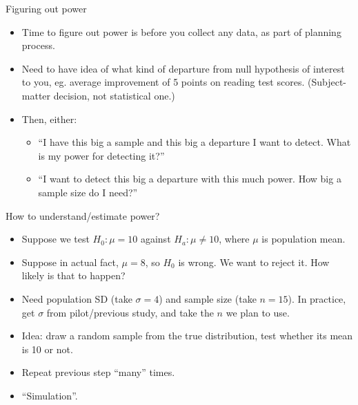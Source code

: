 \documentclass[
  ignorenonframetext,
]{beamer}
\providecommand{\tightlist}{%
  \setlength{\itemsep}{0pt}\setlength{\parskip}{0pt}}
\begin{document}
\begin{frame}{Figuring out power}
\protect\hypertarget{figuring-out-power}{}

\begin{itemize}
\tightlist
\item
  Time to figure out power is before you collect any data, as part of
  planning process.
\item
  Need to have idea of what kind of departure from null hypothesis of
  interest to you, eg. average improvement of 5 points on reading test
  scores. (Subject-matter decision, not statistical one.)
\item
  Then, either:

  \begin{itemize}
  \tightlist
  \item
    ``I have this big a sample and this big a departure I want to
    detect. What is my power for detecting it?''
  \item
    ``I want to detect this big a departure with this much power. How
    big a sample size do I need?''
  \end{itemize}
\end{itemize}

\end{frame}

\begin{frame}{How to understand/estimate power?}
\protect\hypertarget{how-to-understandestimate-power}{}

\begin{itemize}
\tightlist
\item
  Suppose we test \(H_0 : \mu = 10\) against \(H_a : \mu \ne 10\), where
  \(\mu\) is population mean.
\item
  Suppose in actual fact, \(\mu = 8\), so \(H_0\) is wrong. We want to
  reject it. How likely is that to happen?
\item
  Need population SD (take \(\sigma = 4\)) and sample size (take
  \(n = 15\)). In practice, get \(\sigma\) from pilot/previous study,
  and take the \(n\) we plan to use.
\item
  Idea: draw a random sample from the true distribution, test whether
  its mean is 10 or not.
\item
  Repeat previous step ``many'' times.
\item
  ``Simulation''.
\end{itemize}

\end{frame}
\end{document}
